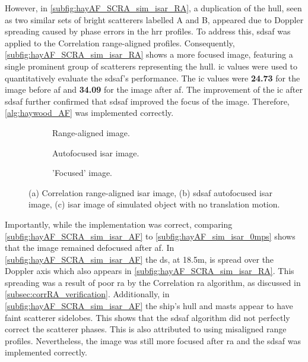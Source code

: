 \documentclass[class=report,11pt,crop=false]{standalone}
\begin{document}
    However, in \autoref{subfig:hayAF_SCRA_sim_isar_RA}, a duplication of the hull, seen as two similar sets of bright scatterers labelled A and B, appeared due to Doppler spreading caused by phase errors in the \gls{hrr} profiles. To address this, \gls{sdsaf} was applied to the Correlation range-aligned profiles. Consequently, \autoref{subfig:hayAF_SCRA_sim_isar_RA} shows a more focused image, featuring a single prominent group of scatterers representing the hull. \gls{ic} values were used to quantitatively evaluate the \gls{sdsaf}'s performance. The \gls{ic} values were \textbf{24.73} for the image before \gls{af} and \textbf{34.09} for the image after \gls{af}. The improvement of the \gls{ic} after \gls{sdsaf} further confirmed that \gls{sdsaf} improved the focus of the image. Therefore, \autoref{alg:haywood_AF} was implemented correctly.
    
    \begin{figure}[H]
        \centering
        \begin{subfigure}{0.3\linewidth}
            \resizebox{\linewidth}{!}{}
            \caption{Range-aligned image. \label{subfig:hayAF_SCRA_sim_isar_RA}}
        \end{subfigure}
        \hspace{0.5cm}
        \begin{subfigure}{0.3\linewidth}
            \resizebox{\linewidth}{!}{}
            \caption{Autofocused \gls{isar} image. \label{subfig:hayAF_SCRA_sim_isar_AF}}
        \end{subfigure}
        \hspace{0.5cm}
        \begin{subfigure}{0.3\linewidth}
            \resizebox{\linewidth}{!}{}
            \caption{'Focused' image.\label{subfig:hayAF_sim_isar_0mps}}
        \end{subfigure}
        \caption{(a) Correlation range-aligned \gls{isar} image, (b) \gls{sdsaf} autofocused \gls{isar} image, (c) \gls{isar} image of simulated object with no translation motion. \label{fig:hayAF_sim}}
    \end{figure}

    Importantly, while the implementation was correct, comparing \autoref{subfig:hayAF_SCRA_sim_isar_AF} to \autoref{subfig:hayAF_sim_isar_0mps} shows that the image remained defocused after \gls{af}. In \autoref{subfig:hayAF_SCRA_sim_isar_AF} the \gls{ds}, at 18.5m, is spread over the Doppler axis which also appears in \autoref{subfig:hayAF_SCRA_sim_isar_RA}. This spreading was a result of poor \gls{ra} by the Correlation \gls{ra} algorithm, as discussed in \autoref{subsec:corrRA_verification}. Additionally, in \autoref{subfig:hayAF_SCRA_sim_isar_AF} the ship's hull and masts appear to have faint scatterer sidelobes. This shows that the \gls{sdsaf} algorithm did not perfectly correct the scatterer phases. This is also attributed to using misaligned range profiles. Nevertheless, the image was still more focused after \gls{ra} and the \gls{sdsaf} was implemented correctly.
    
\end{document}
